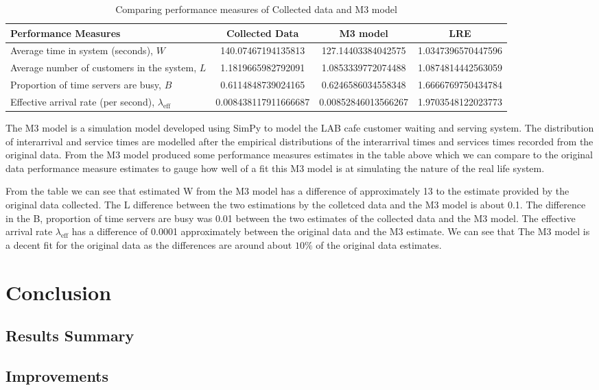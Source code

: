 \documentclass{article}
\begin{document}
\begin{table}[H]
    \centering
    \caption{Comparing performance measures of Collected data and M3 model}
    \begin{tabu}{X S S S}
        \toprule
        \textbf{Performance Measures} & \textbf{Collected Data} & \textbf{M3 model}& \textbf{LRE}\\
        \midrule
        Average time in system (seconds), $W$ & 140.07467194135813 & 127.14403384042575 & 1.0347396570447596\\
        Average number of customers in the system, $L$ & 1.1819665982792091 & 1.0853339772074488 & 1.0874814442563059\\
        Proportion of time servers are busy, $B$ & 0.6114848739024165 & 0.6246586034558348 & 1.6666769750434784\\
        Effective arrival rate (per second), $\lambda_{\text{eff}}$ & 0.008438117911666687 & 0.00852846013566267 & 1.9703548122023773\\
        \bottomrule
    \end{tabu}
    \label{tab:M3}
\end{table}

The M3 model is a simulation model developed using SimPy to model the LAB cafe customer waiting and serving system. The distribution of interarrival and service times are modelled after the empirical distributions of the interarrival times and services times recorded from the original data. From the M3 model produced some performance measures estimates in the table above which we can compare to the original data performance measure estimates to gauge how well of a fit this M3 model is at simulating the nature of the real life system.

From the table we can see that estimated W from the M3 model has a difference of approximately 13 to the estimate provided by the original data collected. The L difference between the two estimations by the colletced data and the M3 model is about 0.1. The difference in the B, proportion of time servers are busy was 0.01 between the two estimates of the collected data and the M3 model. The effective arrival rate $\lambda_{\text{eff}}$ has a difference of 0.0001 approximately between the original data and the M3 estimate. We can see that The M3 model is a decent fit for the original data as the differences are around about $10\%$ of the original data estimates.

\section{Conclusion}

\subsection{Results Summary}


\subsection{Improvements}
\subsection{}
\subsection{}




\end{document}
